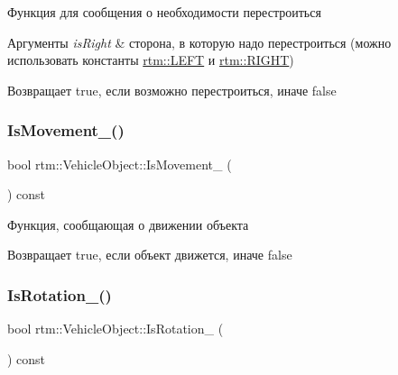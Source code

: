 Функция для сообщения о необходимости перестроиться 


\begin{DoxyParams}{Аргументы}
{\em is\+Right} & сторона, в которую надо перестроиться (можно использовать константы \hyperlink{namespacertm_a92d29773a54951290dd89f754fb39a8c}{rtm\+::\+L\+E\+FT} и \hyperlink{namespacertm_a18eb7493925a15e12096e1a6170c3da7}{rtm\+::\+R\+I\+G\+HT}) \\
\hline
\end{DoxyParams}
\begin{DoxyReturn}{Возвращает}
true, если возможно перестроиться, иначе false 
\end{DoxyReturn}
\mbox{\label{classrtm_1_1_vehicle_object_adcccb796e4b1b404a25512fa8491cd43}} 
\subsubsection{\texorpdfstring{Is\+Movement\+\_\+()}{IsMovement\_()}}
{\footnotesize\ttfamily bool rtm\+::\+Vehicle\+Object\+::\+Is\+Movement\+\_\+ (\begin{DoxyParamCaption}{ }\end{DoxyParamCaption}) const\hspace{0.3cm}{\ttfamily [protected]}}



Функция, сообщающая о движении объекта 

\begin{DoxyReturn}{Возвращает}
true, если объект движется, иначе false 
\end{DoxyReturn}
\mbox{\label{classrtm_1_1_vehicle_object_a7cb07a20e09d1460ec3d2dd70d62aba2}} 
\subsubsection{\texorpdfstring{Is\+Rotation\+\_\+()}{IsRotation\_()}}
{\footnotesize\ttfamily bool rtm\+::\+Vehicle\+Object\+::\+Is\+Rotation\+\_\+ (\begin{DoxyParamCaption}{ }\end{DoxyParamCaption}) const\hspace{0.3cm}{\ttfamily [protected]}}



